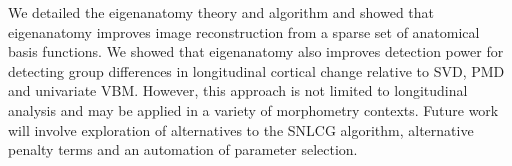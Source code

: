 \documentclass{llncs}
\begin{document}
 \newline \newline We detailed the eigenanatomy theory and algorithm and showed that eigenanatomy improves image reconstruction from a sparse set of anatomical basis functions.  We showed that eigenanatomy also improves detection power for detecting group differences in longitudinal cortical change relative to SVD, PMD and univariate VBM.  However, this approach is not limited to longitudinal analysis and may be applied in a variety of morphometry contexts.  Future work will involve exploration of alternatives to the SNLCG algorithm, alternative penalty terms and an automation of parameter selection.



\end{document}
